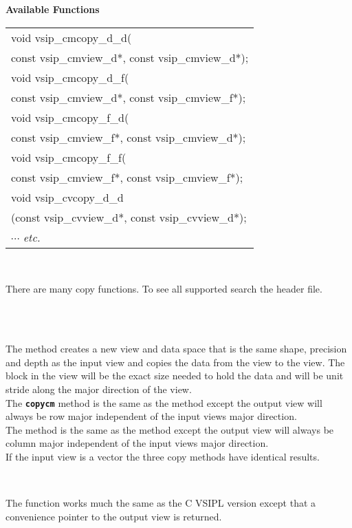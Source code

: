 \\\cvsiplh
\\ \hspace*{.8cm} \vspace*{.1cm} \textbf{Available Functions }
\\ \hspace*{1cm} {\ttfamily
\begin{tabular}[H]{l}
void vsip\_cmcopy\_d\_d(\\*
\hspace{1cm}const vsip\_cmview\_d*, const vsip\_cmview\_d*);\\
void vsip\_cmcopy\_d\_f(\\*
\hspace{1cm}const vsip\_cmview\_d*, const vsip\_cmview\_f*);\\
void vsip\_cmcopy\_f\_d(\\*
\hspace{1cm}const vsip\_cmview\_f*, const vsip\_cmview\_d*);\\
void vsip\_cmcopy\_f\_f(\\*
\hspace{1cm}const vsip\_cmview\_f*, const vsip\_cmview\_f*);\\
void vsip\_cvcopy\_d\_d\\*
\hspace{1cm}(const vsip\_cvview\_d*, const vsip\_cvview\_d*);\\
$\cdots$  \emph{etc.} \end{tabular}
}
\\ \hspace*{1cm}
\parbox{11cm}{There are many copy functions. To see all supported search the  header file.\footnotemark}
\\\pyjvsiph
{}
\\\hspace*{1cm}\parbox{11cm}{The  method creates a new view and data space that is the same shape, precision and depth as the input view and copies the data from the  view to the  view. The block in the  view will be the exact size needed to hold the data and will be unit stride along the major direction of the  view.\\The {\texttt{\bfseries{copycm}}} method is the same as the  method except the output view will always be row major independent of the input views major direction.\\The {} method is the same as the  method except the output view will always be column major independent of the input views major direction.\\If the input view is a vector the three copy methods have identical results.}
\\\hspace*{1cm}\parbox{11cm}{The  function works much the same as the C VSIPL version except that a convenience pointer to the output view is returned.}
